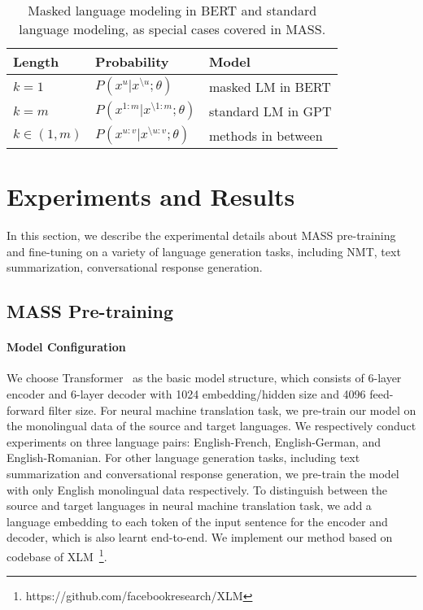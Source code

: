 \documentclass{article}
\begin{document}
	
	\begin{table}[!t]
		\small
		\centering
		\begin{tabular}{l |l |l}
			\toprule
			Length & Probability & Model \\
			\midrule
			$k=1$ & $P(x^{u}|x^{\setminus u};\theta)$ & masked LM in BERT   \\
			$k=m$ & $P(x^{1:m}|x^{\setminus 1:m };\theta)$ & standard LM in GPT\\
			$k\in (1,m)$ &$P(x^{u:v}|x^{\setminus u:v};\theta)$ & methods in between \\
			\bottomrule
		\end{tabular}
		\caption{Masked language modeling in BERT and standard language modeling, as special cases covered in MASS.}
		\label{tab_unified}
	\end{table}	
	
	\section{Experiments and Results}
	\label{sec_exp}
	In this section, we describe the experimental details about MASS pre-training and fine-tuning on a variety of language generation tasks, including NMT, text summarization, conversational response generation.
	
	\subsection{MASS Pre-training}
	
	\paragraph{Model Configuration} We choose Transformer~\cite{DBLP:conf/nips/VaswaniSPUJGKP17} as the basic model structure, which consists of 6-layer encoder and 6-layer decoder with 1024 embedding/hidden size and 4096 feed-forward filter size. For neural machine translation task, we pre-train our model on the monolingual data of the source and target languages. We respectively conduct experiments on three language pairs: English-French, English-German, and English-Romanian. For other language generation tasks, including text summarization and conversational response generation, we pre-train the model with only English monolingual data respectively. 
	To distinguish between the source and target languages in neural machine translation task, we add a language embedding to each token of the input sentence for the encoder and decoder, which is also learnt end-to-end. We implement our method based on codebase of XLM~\footnote{https://github.com/facebookresearch/XLM}. 
\end{document}
